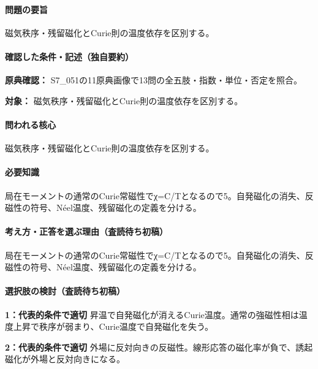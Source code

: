 \paragraph{問題の要旨} 磁気秩序・残留磁化とCurie則の温度依存を区別する。

\paragraph{確認した条件・記述（独自要約）}\mbox{}\par

\noindent\textbf{原典確認：} S7\_051の11原典画像で13問の全五肢・指数・単位・否定を照合。\par

\noindent\textbf{対象：} 磁気秩序・残留磁化とCurie則の温度依存を区別する。\par

\paragraph{問われる核心} 磁気秩序・残留磁化とCurie則の温度依存を区別する。

\paragraph{必要知識} 局在モーメントの通常のCurie常磁性でχ=C/Tとなるので5。自発磁化の消失、反磁性の符号、Néel温度、残留磁化の定義を分ける。

\paragraph{考え方・正答を選ぶ理由（査読待ち初稿）} 局在モーメントの通常のCurie常磁性でχ=C/Tとなるので5。自発磁化の消失、反磁性の符号、Néel温度、残留磁化の定義を分ける。

\paragraph{選択肢の検討（査読待ち初稿）}\mbox{}\par

\noindent\textbf{1：代表的条件で適切} 昇温で自発磁化が消えるCurie温度。通常の強磁性相は温度上昇で秩序が弱まり、Curie温度で自発磁化を失う。\par

\noindent\textbf{2：代表的条件で適切} 外場に反対向きの反磁性。線形応答の磁化率が負で、誘起磁化が外場と反対向きになる。\par

